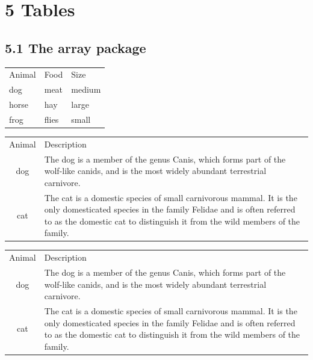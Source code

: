 \documentclass{article}
\begin{document}
\section*{5 Tables}

\subsection*{ 5.1 The array package}

 \begin{tabular}{lll}
 Animal & Food & Size \\
 dog & meat & medium \\
 horse & hay & large \\
 frog & flies & small \\
 \end{tabular}

\vspace{2em}

 \begin{tabular}{cl}
 Animal & Description \\
 dog  & The dog is a member of the genus Canis, which forms part of the  wolf-like canids, and is the most widely abundant
 terrestrial carnivore. \\
 
 cat & The cat is a domestic species of small carnivorous mammal. It is the  only domesticated species in the family Felidae and is often referred  to as the domestic cat to distinguish it from the wild members of the family. \\

 \end{tabular}

\vspace{2em}

 \begin{tabular}{cp{9cm}}
 Animal & Description \\
 dog  & The dog is a member of the genus Canis, which forms part of the  wolf-like canids, and is the most widely abundant
 terrestrial carnivore. \\
 
 cat & The cat is a domestic species of small carnivorous mammal. It is the  only domesticated species in the family Felidae and is often referred  to as the domestic cat to distinguish it from the wild members of the family. \\

 \end{tabular}

\vspace{2em}
\end{document}
